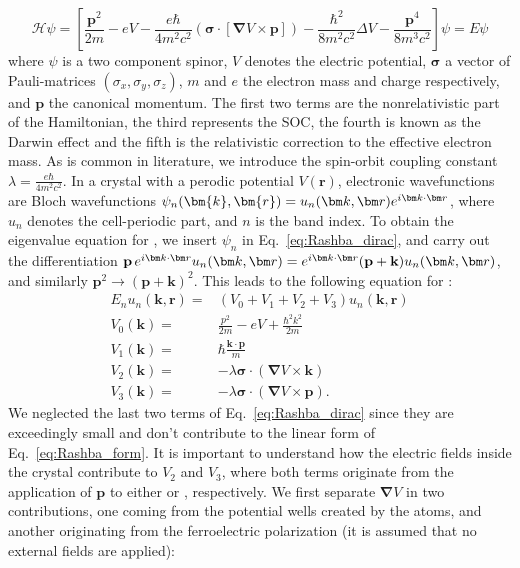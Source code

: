 \begin{equation}
	\label{eq:Rashba_dirac}
	\mathcal{H} \psi = \left[\frac{\bm{p}^2}{2m} - e V - \frac{e \hbar}{4m^2c^2}(\bm{\sigma}\cdot[\bm{\nabla}V \times \bm{p}]) - \frac{\hbar^2}{8m^2c^2} \Delta V - \frac{\bm{p}^4}{8m^3c^2}\right]\psi = E\psi
\end{equation}
where $\psi$ is a two component spinor, $V$ denotes the electric potential, $\bm{\sigma}$ a vector of Pauli-matrices $(\sigma_x, \sigma_y, \sigma_z)$, $m$ and $e$ the electron mass and charge respectively, and $\bm{p}$ the canonical momentum. The first two terms are the nonrelativistic part of the Hamiltonian, the third represents the SOC, the fourth is known as the Darwin effect and the fifth is the relativistic correction to the effective electron mass. 
As is common in literature, we introduce the spin-orbit coupling constant $\lambda = \frac{e \hbar}{4m^2c^2}$.
In a crystal with a perodic potential $V(\mathbf{r})$, electronic wavefunctions are Bloch wavefunctions $\psi_n(\bm{k}, \bm{r}) = \Unkr \Eikr$, where $u_n$ denotes the cell-periodic part, and $n$ is the band index.
To obtain the eigenvalue equation for \unkr, we insert $\psi_n$ in Eq.~\ref{eq:Rashba_dirac}, and carry out the differentiation $\mathbf{p} \, \Eikr\Unkr = \Eikr(\mathbf{p} + \mathbf{k})\Unkr$, and similarly $\mathbf{p}^2 \rightarrow (\mathbf{p}+\mathbf{k})^2$. This leads to the following equation for \unkr:
\begin{align}
	\label{eq:Rashba_unk_Vs}
	E_n u_n(\bm{k}, \bm{r}) =& \left(V_0 + V_1  +  V_2 + V_3 \right) u_n(\bm{k}, \bm{r}) \\
	V_0(\bm{k}) =& \frac{p^2}{2m} - eV + \frac{\hbar^2 k^2}{2m} \\
	V_1(\bm{k}) =& \hbar\frac{\bm{k}\cdot\bm{p}}{m} \\
	V_2(\bm{k}) =& -\lambda \bm{\sigma} \cdot ( \bm{\nabla}V \times \bm{k}) \\
	V_3(\bm{k}) =& -\lambda \bm{\sigma} \cdot ( \bm{\nabla}V \times \bm{p}).
\end{align}
We neglected the last two terms of Eq.~\ref{eq:Rashba_dirac} since they are exceedingly small and don't contribute to the linear form of Eq.~\ref{eq:Rashba_form}.
It is important to understand how the electric fields inside the crystal contribute to $V_2$ and $V_3$, where both terms originate from the application of $\bm{p}$ to either \unkr or \eikr, respectively.
We first separate $\bm{\nabla}V$ in two contributions, one coming from the potential wells created by the atoms, and another originating from the ferroelectric polarization (it is assumed that no external fields are applied):
